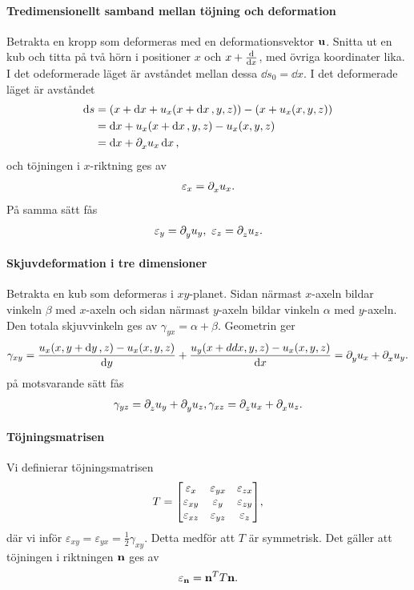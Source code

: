 \paragraph{Tredimensionellt samband mellan töjning och deformation}
Betrakta en kropp som deformeras med en deformationsvektor $\vb{u}$. Snitta ut en kub och titta på två hörn i positioner $x$ och $x + \dv{x}$, med övriga koordinater lika. I det odeformerade läget är avståndet mellan dessa $\dd{s_{0}} = \dd{x}$. I det deformerade läget är avståndet
\begin{align*}
	\dd{s} &= (x + \dd{x} + u_{x}(x + \dd{x}, y, z)) - (x + u_{x}(x, y, z)) \\
	       &= \dd{x} + u_{x}(x + \dd{x}, y, z) - u_{x}(x, y, z) \\
	       &= \dd{x} + \partial_{x}^{}u_{x}\dd{x},
\end{align*}
och töjningen i $x$-riktning ges av
\begin{align*}
	\varepsilon_{x} = \partial_{x}^{}u_{x}.
\end{align*}
På samma sätt fås
\begin{align*}
	\varepsilon_{y} = \partial_{y}^{}u_{y},\ \varepsilon_{z} = \partial_{z}^{}u_{z}.
\end{align*}

\paragraph{Skjuvdeformation i tre dimensioner}
Betrakta en kub som deformeras i $xy$-planet. Sidan närmast $x$-axeln bildar vinkeln $\beta$ med $x$-axeln och sidan närmast $y$-axeln bildar vinkeln $\alpha$ med $y$-axeln. Den totala skjuvvinkeln ges av $\gamma_{yx} = \alpha + \beta$. Geometrin ger
\begin{align*}
	\gamma_{xy} = \frac{u_{x}(x, y + \dd{y}, z) - u_{x}(x, y, z)}{\dd{y}} + \frac{u_{y}(x + dd{x}, y, z) - u_{x}(x, y, z)}{\dd{x}} = \partial_{y}^{}u_{x} + \partial_{x}^{}u_{y}.
\end{align*}
på motsvarande sätt fås
\begin{align*}
	\gamma_{yz} = \partial_{z}^{}u_{y} + \partial_{y}^{}u_{z}, \gamma_{xz} = \partial_{z}^{}u_{x} + \partial_{x}^{}u_{z}.
\end{align*}

\paragraph{Töjningsmatrisen}
Vi definierar töjningsmatrisen
\begin{align*}
	T =
	\mqty[
		\varepsilon_{x}  & \varepsilon_{yx} & \varepsilon_{zx} \\
		\varepsilon_{xy} & \varepsilon_{y}  & \varepsilon_{zy} \\
		\varepsilon_{xz} & \varepsilon_{yz} & \varepsilon_{z}
	],
\end{align*}
där vi inför $\varepsilon_{xy} = \varepsilon_{yx} = \frac{1}{2}\gamma_{xy}$. Detta medför att $T$ är symmetrisk. Det gäller att töjningen i riktningen $\vb{n}$ ges av
\begin{align*}
	\varepsilon_{\vb{n}} = \vb{n}^{T}T\vb{n}.
\end{align*}

